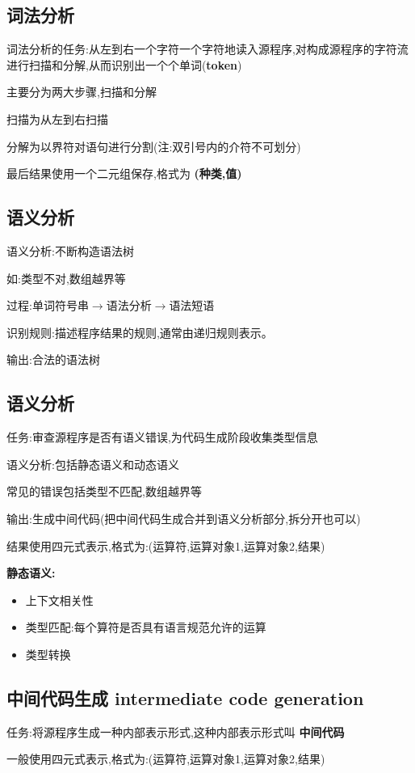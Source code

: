\subsection{词法分析}
词法分析的任务:从左到右一个字符一个字符地读入源程序,对构成源程序的字符流进行扫描和分解,从而识别出一个个单词(\textbf{token})

主要分为两大步骤,扫描和分解

扫描为从左到右扫描

分解为以界符对语句进行分割(注:双引号内的介符不可划分)

最后结果使用一个二元组保存,格式为 \textbf{(种类,值)}

\subsection{语义分析}
语义分析:不断构造语法树

如:类型不对,数组越界等

过程:单词符号串$\to$语法分析$\to$语法短语

识别规则:描述程序结果的规则,通常由递归规则表示。

输出:合法的语法树

\subsection{语义分析}
任务:审查源程序是否有语义错误,为代码生成阶段收集类型信息

语义分析:包括静态语义和动态语义

常见的错误包括类型不匹配,数组越界等

输出:生成中间代码(把中间代码生成合并到语义分析部分,拆分开也可以)

结果使用四元式表示,格式为:(运算符,运算对象1,运算对象2,结果)

\textbf{静态语义:}
\begin{itemize}
 \item 上下文相关性
 \item 类型匹配:每个算符是否具有语言规范允许的运算
 \item 类型转换
\end{itemize}

\subsection{中间代码生成 intermediate code generation}
任务:将源程序生成一种内部表示形式,这种内部表示形式叫 \textbf{中间代码}

一般使用四元式表示,格式为:(运算符,运算对象1,运算对象2,结果)


